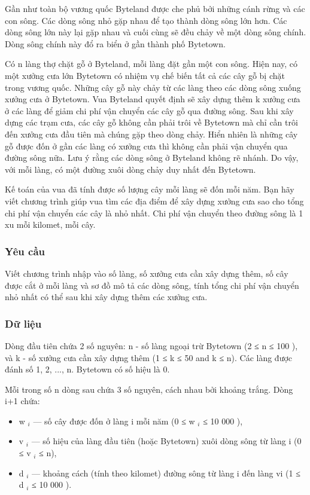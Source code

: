 



   Gần như toàn bộ vương quốc Byteland được che phủ bởi những cánh rừng và các con sông. Các dòng sông nhỏ gặp nhau để tạo thành dòng sông lớn hơn. Các dòng sông lớn này lại gặp nhau và cuối cùng sẽ đều chảy về một dòng sông chính. Dòng sông chính này đổ ra biển ở gần thành phố Bytetown.  

   Có n làng thợ chặt gỗ ở Byteland, mỗi làng đặt gần một con sông. Hiện nay, có một xưởng cưa lớn Bytetown có nhiệm vụ chế biến tất cả các cây gỗ bị chặt trong vương quốc. Những cây gỗ này chảy từ các làng theo các dòng sông xuống xưởng cưa ở Bytetown. Vua Byteland quyết định sẽ xây dựng thêm k xưởng cưa ở các làng để giảm chi phí vận chuyển các cây gỗ qua đường sông. Sau khi xây dựng các trạm cưa, các cây gỗ không cần phải trôi về Bytetown mà chỉ cần trôi đến xưởng cưa đầu tiên mà chúng gặp theo dòng chảy. Hiển nhiên là những cây gỗ được đốn ở gần các làng có xưởng cưa thì không cần phải vận chuyển qua đường sông nữa. Lưu ý rằng các dòng sông ở Byteland không rẽ nhánh. Do vậy, với mỗi làng, có một đường xuôi dòng chảy duy nhất đến Bytetown.  

   Kế toán của vua đã tính được số lượng cây mỗi làng sẽ đốn mỗi năm. Bạn hãy viết chương trình giúp vua tìm các địa điểm để xây dựng xưởng cưa sao cho tổng chi phí vận chuyển các cây là nhỏ nhất. Chi phí vận chuyển theo đường sông là 1 xu mỗi kilomet, mỗi cây.  

\subsubsection{   Yêu cầu  }

   Viết chương trình nhập vào số làng, số xưởng cưa cần xây dựng thêm, số cây được cắt ở mỗi làng và sơ đồ mô tả các dòng sông, tính tổng chi phí vận chuyển nhỏ nhất có thể sau khi xây dựng thêm các xưởng cưa.  

\subsubsection{   Dữ liệu  }

   Dòng đầu tiên chứa 2 số nguyên: n - số làng ngoại trừ Bytetown (2 ≤ n ≤ 100 ), và k - số xưởng cưa cần xây dựng thêm (1 ≤ k ≤ 50 and k ≤ n). Các làng được đánh số 1, 2, ..., n. Bytetown có số hiệu là 0.  

   Mỗi trong số n dòng sau chứa 3 số nguyên, cách nhau bởi khoảng trắng. Dòng i+1 chứa:  
\begin{itemize}
	\item     w    $_     i    $    — số cây được đốn ở làng i mỗi năm (0 ≤ w    $_     i    $    ≤ 10 000 ),   
	\item     v    $_     i    $    — số hiệu của làng đầu tiên (hoặc Bytetown) xuôi dòng sông từ làng i (0 ≤ v    $_     i    $    ≤ n),   
	\item     d    $_     i    $    — khoảng cách (tính theo kilomet) đường sông từ làng i đến làng vi (1 ≤ d    $_     i    $    ≤ 10 000 ).   
\end{itemize}

